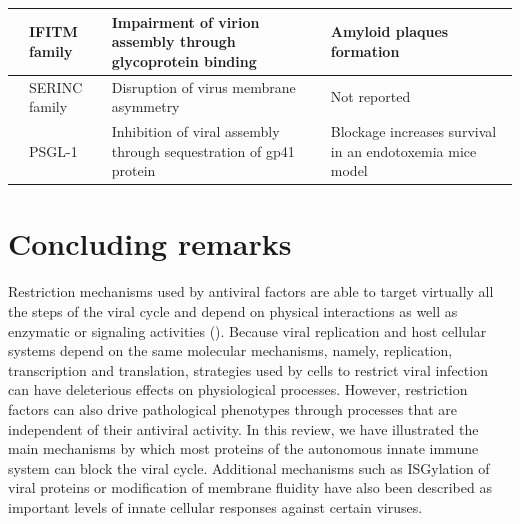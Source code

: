 \documentclass{enslyonreview}
\begin{document}
\begin{table}[!t]
\begin{tabularx}{\textwidth}{|>{\justifying\parindent0pt\arraybackslash}p{2.6cm}|>{\justifying\parindent0pt\arraybackslash}p{2.7cm}|>{\justifying\parindent0pt\arraybackslash}p{3.6cm}|>{\justifying\parindent0pt\arraybackslash}X|}
      \cline{2-4}
      & IFITM family \cite{yuIFITMProteinsRestrict2015,hurInnateImmunityProtein2020} & Impairment of virion assembly through glycoprotein binding & Amyloid plaques formation \\
      \cline{2-4}
      & SERINC family \cite{leonhardtAntiviralHIV1SERINC2023} & Disruption of virus membrane asymmetry & Not reported \\
      \cline{2-4}
      & PSGL-1 \cite{liuPSGL1InhibitsHIV12020,wangRolePSGL1Pathogenesis2019} & Inhibition of viral assembly through sequestration of gp41 protein & Blockage increases survival in an endotoxemia mice model \\
    \hline
  \end{tabularx}
\end{table}

\section{Concluding remarks}

Restriction mechanisms used by antiviral factors are able to target virtually all the steps of
the viral cycle and depend on physical interactions as well as enzymatic or signaling
activities (). Because viral replication and host cellular systems
depend on the same molecular mechanisms, namely, replication, transcription and translation,
strategies used by cells to restrict viral infection can have deleterious effects on
physiological processes. However, restriction factors can also drive pathological phenotypes
through processes that are independent of their antiviral activity. In this review, we have
illustrated the main mechanisms by which most proteins of the autonomous innate immune system
can block the viral cycle. Additional mechanisms such as ISGylation of viral proteins or
modification of membrane fluidity have also been described as important levels of innate
cellular responses against certain viruses.
\end{document}

